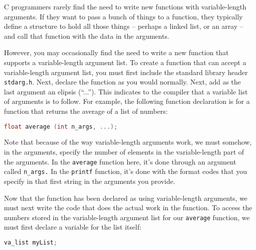 C programmers rarely find the need to write new functions with variable-length
arguments.  If they want to pass a bunch of things to a function, they
typically define a structure to hold all those things -- perhaps a linked list,
or an array -- and call that function with the data in the arguments.

However, you may occasionally find the need to write a new function that
supports a variable-length argument list.  To create a function that can accept
a variable-length argument list, you must first include the standard library
header \texttt{stdarg.h}. Next, declare the function as you would normally.
Next, add as the last argument an elipsis (``...''). This indicates to the
compiler that a variable list of arguments is to follow. For example, the
following function declaration is for a function that returns the average of a
list of numbers:
\lstset{basicstyle=\scriptsize, numbers=left, captionpos=b, tabsize=4}
\begin{lstlisting}[caption=Section \thesection listing \arabic{funccnt},language={C},
breaklines=true,xleftmargin=15pt, label=lst:section\thesection listing\arabic{funccnt}]
	 float average (int n_args, ...);
\end{lstlisting}

Note that because of the way variable-length arguments work, we must somehow,
in the arguments, specify the number of elements in the variable-length part of
the arguments. In the \texttt{average} function here, it's done through an
argument called \texttt{n\_args.} In the \texttt{printf} function, it's done
with the format codes that you specify in that first string in the arguments
you provide.

Now that the function has been declared as using variable-length arguments, we
must next write the code that does the actual work in the function.  To access
the numbers stored in the variable-length argument list for our
\texttt{average} function, we must first declare a variable for the list
itself:
\lstset{basicstyle=\scriptsize, numbers=left, captionpos=b, tabsize=4}
\begin{lstlisting}[caption=Section \thesection listing \arabic{funccnt},language={C},
breaklines=true,xleftmargin=15pt, label=lst:section\thesection listing\arabic{funccnt}]
	 va_list myList;
\end{lstlisting}

